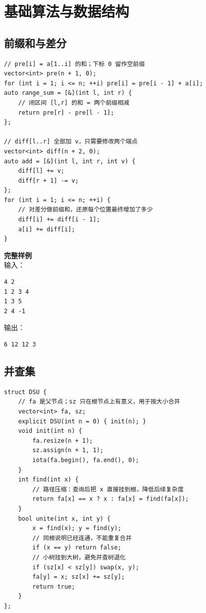 \chapter{基础算法与数据结构}

\section{前缀和与差分}


\begin{lstlisting}[style=cpp]
// pre[i] = a[1..i] 的和；下标 0 留作空前缀
vector<int> pre(n + 1, 0);
for (int i = 1; i <= n; ++i) pre[i] = pre[i - 1] + a[i];
auto range_sum = [&](int l, int r) {
    // 闭区间 [l,r] 的和 = 两个前缀相减
    return pre[r] - pre[l - 1];
};

// diff[l..r] 全部加 v，只需要修改两个端点
vector<int> diff(n + 2, 0);
auto add = [&](int l, int r, int v) {
    diff[l] += v;
    diff[r + 1] -= v;
};
for (int i = 1; i <= n; ++i) {
    // 对差分做前缀和，还原每个位置最终增加了多少
    diff[i] += diff[i - 1];
    a[i] += diff[i];
}
\end{lstlisting}

\begin{card}
\textbf{完整样例}\\
输入：
\begin{lstlisting}
4 2
1 2 3 4
1 3 5
2 4 -1
\end{lstlisting}
输出：
\begin{lstlisting}
6 12 12 3
\end{lstlisting}
\end{card}

\section{并查集}


\begin{lstlisting}[style=cpp]
struct DSU {
    // fa 是父节点；sz 只在根节点上有意义，用于按大小合并
    vector<int> fa, sz;
    explicit DSU(int n = 0) { init(n); }
    void init(int n) {
        fa.resize(n + 1);
        sz.assign(n + 1, 1);
        iota(fa.begin(), fa.end(), 0);
    }
    int find(int x) {
        // 路径压缩：查询后把 x 直接挂到根，降低后续复杂度
        return fa[x] == x ? x : fa[x] = find(fa[x]);
    }
    bool unite(int x, int y) {
        x = find(x); y = find(y);
        // 同根说明已经连通，不能重复合并
        if (x == y) return false;
        // 小树挂到大树，避免并查树退化
        if (sz[x] < sz[y]) swap(x, y);
        fa[y] = x; sz[x] += sz[y];
        return true;
    }
};
\end{lstlisting}

